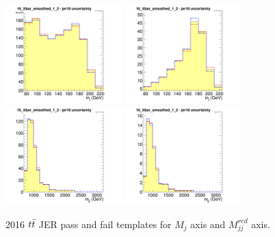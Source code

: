 \begin{figure}[!htb]
	\centering
	\includegraphics[width=0.4\textwidth]{Figures/Uncertainty_16_ttbar_smoothed_1_2_jer16failX.png}
	\includegraphics[width=0.4\textwidth]{Figures/Uncertainty_16_ttbar_smoothed_1_2_jer16passX.png}
	\includegraphics[width=0.4\textwidth]{Figures/Uncertainty_16_ttbar_smoothed_1_2_jer16failY.png}
	\includegraphics[width=0.4\textwidth]{Figures/Uncertainty_16_ttbar_smoothed_1_2_jer16passY.png}
	\caption{2016 $t\bar{t} $ JER pass and fail templates for $M_j$ axis and $M_{jj}^{red}$ axis.}
	\label{fig:jerttbar1}
\end{figure}

